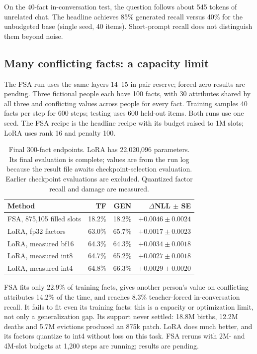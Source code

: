 \documentclass[11pt]{article}
\begin{document}
On the 40-fact in-conversation test, the question follows about 545 tokens of unrelated chat.
The headline achieves 85\% generated recall versus 40\% for the unbudgeted base (single seed,
40 items). Short-prompt recall does not distinguish them beyond noise.

\subsection{Many conflicting facts: a capacity limit}
The FSA run uses the same layers 14--15 in-pair reserve; forced-zero results are pending.
Three fictional people each have 100 facts, with 30 attributes shared by all three and conflicting
values across people for every fact. Training samples 40 facts per step for 600 steps; testing
uses 600 held-out items. Both runs use one seed. The FSA recipe is the headline recipe with its
budget raised to 1M slots; LoRA uses rank 16 and penalty 100.
\begin{table}[!ht]\centering\small
\begin{tabular}{lrrr}\toprule
Method & TF & GEN & $\Delta$NLL $\pm$ SE\\\midrule
FSA, 875,105 filled slots & 18.2\% & 18.2\% & $+0.0046\pm0.0024$\\
LoRA, fp32 factors & 63.0\% & 65.7\% & $+0.0017\pm0.0023$\\
LoRA, measured bf16 & 64.3\% & 64.3\% & $+0.0034\pm0.0018$\\
LoRA, measured int8 & 64.7\% & 65.2\% & $+0.0027\pm0.0018$\\
LoRA, measured int4 & 64.8\% & 66.3\% & $+0.0029\pm0.0020$\\\bottomrule
\end{tabular}
\caption{Final 300-fact endpoints. LoRA has 22,020,096 parameters. Its final evaluation is complete;
values are from the run log because the result file awaits checkpoint-selection evaluation. Earlier
checkpoint evaluations are excluded. Quantized factor recall and damage are measured.}
\label{tab:bigfacts}
\end{table}
FSA fits only 22.9\% of training facts, gives another person's value on conflicting attributes
14.2\% of the time, and reaches 8.3\% teacher-forced in-conversation recall. It fails to fit even
its training facts: this is a capacity or optimization limit, not only a generalization gap.
Its support never settled: 18.8M births, 12.2M deaths and 5.7M evictions produced an 875k patch.
LoRA does much better, and its factors quantize to int4 without loss on this task.
FSA reruns with 2M- and 4M-slot budgets at 1,200 steps are running; results are pending.
\end{document}
